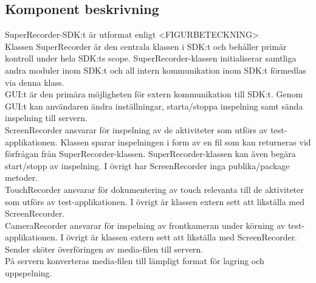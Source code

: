 \subsection{Komponent beskrivning}
SuperRecorder-SDK:t är utformat enligt <FIGURBETECKNING> \\

Klassen SuperRecorder är den centrala klassen i SDK:t och behåller primär kontroll under hela SDK:ts scope. SuperRecorder-klassen initialiserar samtliga andra moduler inom SDK:t och all intern kommunikation inom SDK:t förmedlas via denna klass. \\

GUI:t är den primära möjligheten för extern kommunikation till SDK:t. Genom GUI:t kan användaren ändra inställningar, starta/stoppa inspelning samt sända inspelning till servern. \\

ScreenRecorder ansvarar för inspelning av de aktiviteter som utförs av test-applikationen. Klassen sparar inspelningen i form av en fil som kan returneras vid förfrågan från SuperRecorder-klassen. SuperRecorder-klassen kan även begära start/stopp av inspelning. I övrigt har ScreenRecorder inga publika/package metoder. \\

TouchRecorder ansvarar för dokumentering av touch relevanta till de aktiviteter som utförs av test-applikationen. I övrigt är klassen extern sett att likställa med ScreenRecorder. \\

CameraRecorder ansvarar för inspelning av frontkameran under körning av test-applikationen. I övrigt är klassen extern sett att likställa med ScreenRecorder. \\

Sender sköter överföringen av media-filen till servern. \\

På servern konverteras media-filen till lämpligt format för lagring och uppspelning.
